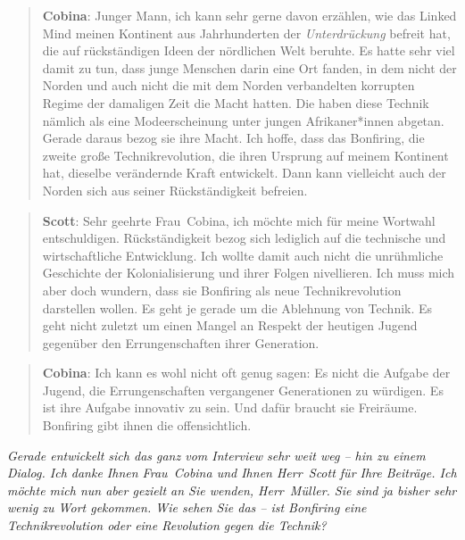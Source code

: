 \documentclass{scrartcl}
\newenvironment{frage}{\itshape}{}
\newenvironment{antworta}{
  \begin{quotation}
  }{
  \end{quotation}
}
\newenvironment{antwortb}{
  \begin{quotation}
  }{
  \end{quotation}
}
\newcommand{\name}[1]{\textbf{#1}}
\begin{document}
\begin{antwortb}
\name{Cobina}: Junger Mann, ich kann sehr gerne davon erzählen, wie
das Linked Mind meinen Kontinent aus Jahrhunderten der
\emph{Unterdrückung} befreit hat, die auf rückständigen Ideen der
nördlichen Welt beruhte. Es hatte sehr viel damit zu tun,
dass junge Menschen darin eine Ort fanden, in dem nicht der
Norden und auch nicht die mit dem Norden verbandelten
korrupten Regime der damaligen Zeit die Macht hatten. Die
haben diese Technik nämlich als eine Modeerscheinung unter
jungen Afrikaner*innen abgetan. Gerade daraus bezog sie ihre
Macht. Ich hoffe, dass das Bonfiring, die zweite große
Technikrevolution, die ihren Ursprung auf meinem Kontinent
hat, dieselbe verändernde Kraft entwickelt. Dann kann
vielleicht auch der Norden sich aus seiner Rückständigkeit
befreien.
\end{antwortb}


\begin{antworta}
\name{Scott}: Sehr geehrte Frau~Cobina, ich möchte mich für meine
Wortwahl entschuldigen. Rückständigkeit bezog sich lediglich
auf die technische und wirtschaftliche Entwicklung. Ich
wollte damit auch nicht die unrühmliche Geschichte der
Kolonialisierung und ihrer Folgen nivellieren. Ich muss mich
aber doch wundern, dass sie Bonfiring als neue
Technikrevolution darstellen wollen. Es geht je gerade um
die Ablehnung von Technik. Es geht nicht zuletzt um einen
Mangel an Respekt der heutigen Jugend gegenüber den
Errungenschaften ihrer Generation.
\end{antworta}


\begin{antwortb}
\name{Cobina}: Ich kann es wohl nicht oft genug sagen: Es nicht die
Aufgabe der Jugend, die Errungenschaften vergangener
Generationen zu würdigen. Es ist ihre Aufgabe innovativ zu
sein. Und dafür braucht sie Freiräume. Bonfiring gibt ihnen
die offensichtlich.
\end{antwortb}


\begin{frage}
Gerade entwickelt sich das ganz vom Interview sehr weit weg
– hin zu einem Dialog. Ich danke Ihnen Frau~Cobina und Ihnen
Herr~Scott für Ihre Beiträge. Ich möchte mich nun aber
gezielt an Sie wenden, Herr~Müller. Sie sind ja bisher sehr
wenig zu Wort gekommen. Wie sehen Sie das – ist Bonfiring
eine Technikrevolution oder eine Revolution gegen die
Technik?
\end{frage}
\end{document}
